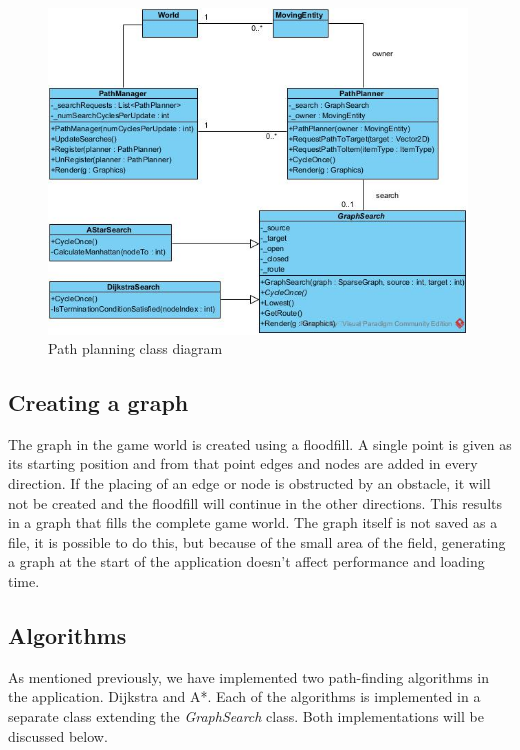 \documentclass[11pt]{article}
\begin{document}
    \begin{figure}[h!]

        \includegraphics[width=30em]{PathFinding.jpg}

        \caption{Path planning class diagram}

        \label{fig:pathPlanClassDiagram}

    \end{figure}
    
    \subsection{Creating a graph}\label{subsec:pathgraphcreation}
    The graph in the game world is created using a floodfill.
    A single point is given as its starting position and from that point edges and nodes are added in every direction.
    If the placing of an edge or node is obstructed by an obstacle, it will not be created and the floodfill will continue
    in the other directions.
    This results in a graph that fills the complete game world.
    The graph itself is not saved as a file, it is possible to do this, but because of the small area of the field,
    generating a graph at the start of the application doesn't affect performance and loading time.
    
    \subsection{Algorithms}\label{subsec:pathalgorithms}
    As mentioned previously, we have implemented two path-finding algorithms in the application.
    Dijkstra and A*. Each of the algorithms is implemented in a separate class extending the \textit{GraphSearch} class.
    Both implementations will be discussed below.
    
\end{document}
